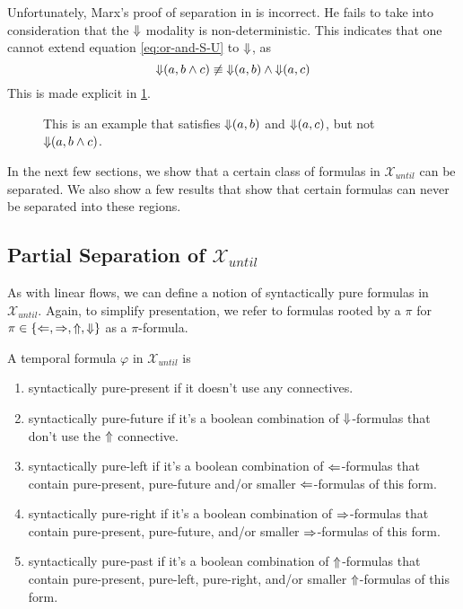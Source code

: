 \documentclass[a4paper,UKenglish,cleveref, autoref, thm-restate, numberwithinsect]{lipics-v2021}
\def\Larrow{\ensuremath\mathord{\Leftarrow}}
\def\Rarrow{\ensuremath\mathord{\Rightarrow}}
\def\Uarrow{\ensuremath\mathord{\Uparrow}}
\def\Darrow{\ensuremath\mathord{\Downarrow}}
\begin{document}
Unfortunately, Marx's proof of separation in \cite{xpathComplete} is incorrect. He fails to take into consideration that the $\Darrow$ modality is non-deterministic. This indicates that one cannot extend equation \eqref{eq:or-and-S-U} to $\Darrow$, as
\begin{equation*}
    \Darrow(a, b \land c) \not\equiv \Darrow(a, b) \land \Darrow(a, c)
\end{equation*}
This is made explicit in \cref{fig:darrow-a-b-and-c}.
\begin{figure}[h]
    \centering
    \caption[]{This is an example that satisfies $\Darrow(a, b)$ and $\Darrow(a, c)$, but not $\Darrow(a, b \land c)$.}
    \label{fig:darrow-a-b-and-c}
\end{figure}

In the next few sections, we show that a certain class of formulas in $\mathcal{X}_{until}$ can be separated. We also show a few results that show that certain formulas can never be separated into these regions.

\subsection{Partial Separation of $\mathcal{X}_{until}$}

As with linear flows, we can define a notion of syntactically pure formulas in $\mathcal{X}_{until}$. Again, to simplify presentation, we refer to formulas rooted by a $\pi$ for $\pi \in \{\Larrow, \Rarrow, \Uarrow, \Darrow\}$ as a $\pi$-formula.
\begin{definition}
    A temporal formula $\varphi$ in $\mathcal{X}_{until}$ is
    \begin{enumerate}
        \item syntactically pure-present if it doesn't use any connectives.
        \item syntactically pure-future if it's a boolean combination of $\Darrow$-formulas that don't use the $\Uarrow$ connective.
        \item syntactically pure-left if it's a boolean combination of $\Larrow$-formulas that contain pure-present, pure-future and/or smaller $\Larrow$-formulas of this form.
        \item syntactically pure-right if it's a boolean combination of $\Rarrow$-formulas that contain pure-present, pure-future, and/or smaller $\Rarrow$-formulas of this form.
        \item syntactically pure-past if it's a boolean combination of $\Uarrow$-formulas that contain pure-present, pure-left, pure-right, and/or smaller $\Uarrow$-formulas of this form.
    \end{enumerate}
\end{definition}
\end{document}
